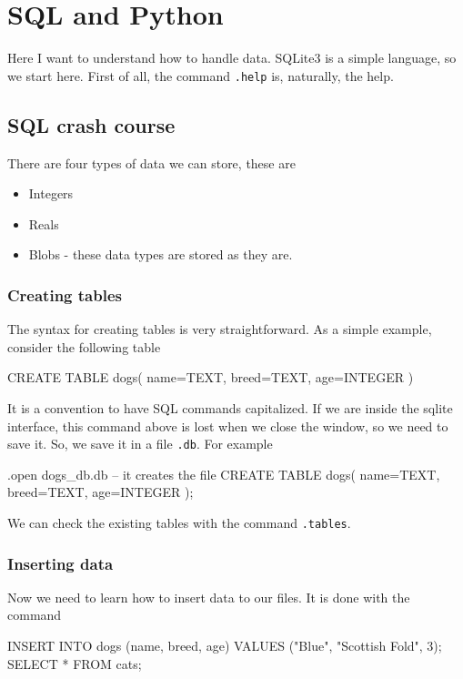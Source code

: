 \section{SQL and Python}

Here I want to understand how to handle data. SQLite3 is a simple language, so we start here. First of all, the command \verb|.help| 
is, naturally, the help.

\subsection{SQL crash course}

There are four types of data we can store, these are
\begin{itemize}
    \item Integers
    \item Reals
    \item Blobs - these data types are stored as they are. 
\end{itemize}

\subsubsection{Creating tables}

The syntax for creating tables is very straightforward. As a simple example, consider the following table
\begin{listing}{1}
CREATE TABLE dogs(
    name=TEXT,
    breed=TEXT,
    age=INTEGER
)
\end{listing}
It is a convention to have SQL commands capitalized. If we are inside the sqlite interface, this command above is 
lost when we close the window, so we need to save it. So, we save it in a file \verb|.db|. For example
\begin{listing}{1}
.open dogs_db.db -- it creates the file
CREATE TABLE dogs(
    name=TEXT,
    breed=TEXT,
    age=INTEGER
);
\end{listing}
We can check the existing tables with the command \verb|.tables|.

\subsubsection{Inserting data}

Now we need to learn how to insert data to our files. It is done with the command
\begin{listing}{1}
INSERT INTO dogs (name, breed, age) VALUES ("Blue", "Scottish Fold", 3);
SELECT * FROM cats;
\end{listing}   

